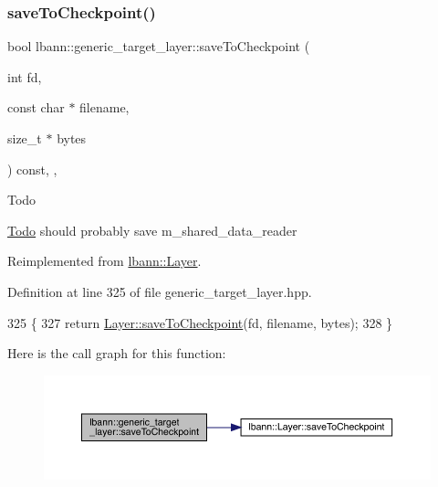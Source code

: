 \subsubsection{\texorpdfstring{save\+To\+Checkpoint()}{saveToCheckpoint()}}
{\footnotesize\ttfamily bool lbann\+::generic\+\_\+target\+\_\+layer\+::save\+To\+Checkpoint (\begin{DoxyParamCaption}\item[{int}]{fd,  }\item[{const char $\ast$}]{filename,  }\item[{size\+\_\+t $\ast$}]{bytes }\end{DoxyParamCaption}) const\hspace{0.3cm}{\ttfamily [inline]}, {\ttfamily [override]}, {\ttfamily [virtual]}}

\begin{DoxyRefDesc}{Todo}
\item[\hyperlink{todo__todo000024}{Todo}]should probably save m\+\_\+shared\+\_\+data\+\_\+reader \end{DoxyRefDesc}


Reimplemented from \hyperlink{classlbann_1_1Layer_a994a4beabbace598193b1611eb06b07e}{lbann\+::\+Layer}.



Definition at line 325 of file generic\+\_\+target\+\_\+layer.\+hpp.


\begin{DoxyCode}
325                                                                                     \{
327     \textcolor{keywordflow}{return} \hyperlink{classlbann_1_1Layer_a994a4beabbace598193b1611eb06b07e}{Layer::saveToCheckpoint}(fd, filename, bytes);
328   \}
\end{DoxyCode}
Here is the call graph for this function\+:\nopagebreak
\begin{figure}[H]
\begin{center}
\leavevmode
\includegraphics[width=350pt]{classlbann_1_1generic__target__layer_aff8b79ff0392bd78c44a5a4f6b6ef549_cgraph}
\end{center}
\end{figure}
\mbox{\label{classlbann_1_1generic__target__layer_a9591bdc69e3de9c10fbf71d1faef917a}} 
